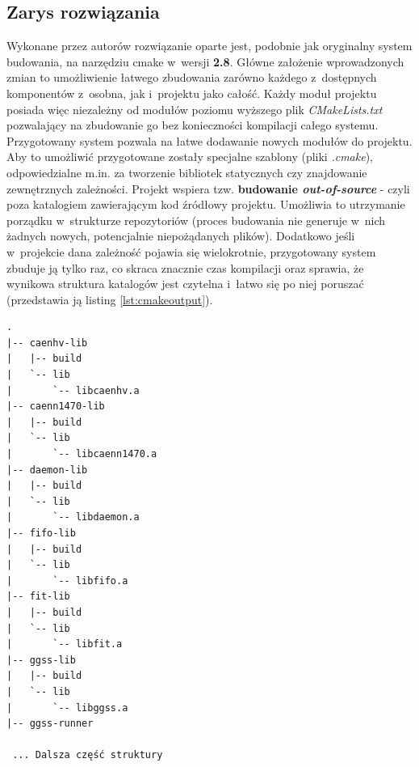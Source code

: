 \subsection{Zarys rozwiązania} 
Wykonane przez autorów rozwiązanie oparte jest, podobnie jak oryginalny system budowania, na narzędziu \gls*{cmake} w~wersji \textbf{2.8}. Główne założenie wprowadzonych zmian to umożliwienie łatwego zbudowania zarówno każdego z~dostępnych komponentów z~osobna, jak i~projektu jako całość. Każdy moduł projektu posiada więc niezależny od modułów poziomu wyższego plik \textit{CMakeLists.txt} pozwalający na zbudowanie go bez konieczności kompilacji całego systemu. Przygotowany system pozwala na łatwe dodawanie nowych modułów do projektu. Aby to umożliwić przygotowane zostały specjalne szablony (pliki \textit{.cmake}), odpowiedzialne m.in. za tworzenie bibliotek statycznych czy znajdowanie zewnętrznych zależności. Projekt wspiera tzw. \textbf{budowanie \textit{out-of-source}} - czyli poza katalogiem zawierającym kod źródłowy projektu. Umożliwia to utrzymanie porządku w~strukturze repozytoriów (proces budowania nie generuje w~nich żadnych nowych, potencjalnie niepożądanych plików). Dodatkowo jeśli w~projekcie dana zależność pojawia się wielokrotnie, przygotowany system zbuduje ją tylko raz, co skraca znacznie czas kompilacji oraz sprawia, że wynikowa struktura katalogów jest czytelna i~łatwo się po niej poruszać (przedstawia ją listing \ref{lst:cmakeoutput}). 

\begin{lstlisting}[language=Cmd, caption={Fragment struktury katalogów wygenerowanej przez nowy system budujący projekt (użycie dla repozytorium \textit{ggss-runner}). Dla uproszczenia pominięta została zawartość katalogów \textit{build}. Przykład ilustruje płaską strukturę wynikową ułatwiającą szybkie znalezienie odpowiedniej biblioteki lub pliku wykonywalnego (tutaj \textit{ggss-runner})}, label={lst:cmakeoutput}]
.
|-- caenhv-lib
|   |-- build
|   `-- lib
|       `-- libcaenhv.a
|-- caenn1470-lib
|   |-- build
|   `-- lib
|       `-- libcaenn1470.a
|-- daemon-lib
|   |-- build
|   `-- lib
|       `-- libdaemon.a
|-- fifo-lib
|   |-- build
|   `-- lib
|       `-- libfifo.a
|-- fit-lib
|   |-- build
|   `-- lib
|       `-- libfit.a
|-- ggss-lib
|   |-- build
|   `-- lib
|       `-- libggss.a
|-- ggss-runner
 
 ... Dalsza część struktury
\end{lstlisting}


